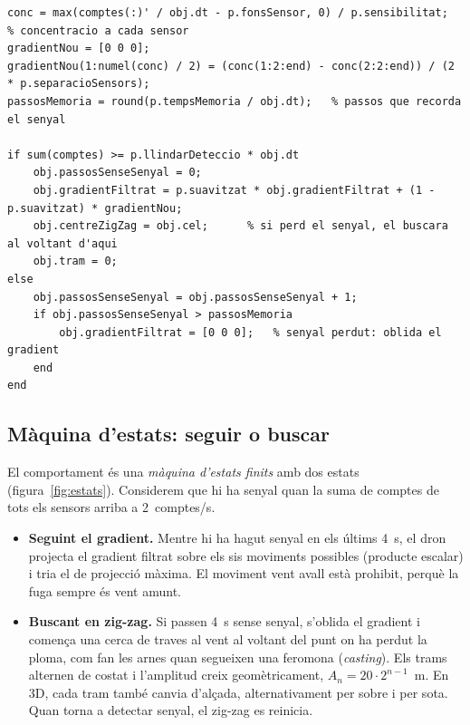 \documentclass[11pt,a4paper]{article}
\begin{document}
\begin{lstlisting}[caption={Estimació i filtratge del gradient, i detecció del senyal (part de \texttt{Dron.gradientDecidir}).}, label=lst:gradest]
conc = max(comptes(:)' / obj.dt - p.fonsSensor, 0) / p.sensibilitat;   % concentracio a cada sensor
gradientNou = [0 0 0];
gradientNou(1:numel(conc) / 2) = (conc(1:2:end) - conc(2:2:end)) / (2 * p.separacioSensors);
passosMemoria = round(p.tempsMemoria / obj.dt);   % passos que recorda el senyal

if sum(comptes) >= p.llindarDeteccio * obj.dt
    obj.passosSenseSenyal = 0;
    obj.gradientFiltrat = p.suavitzat * obj.gradientFiltrat + (1 - p.suavitzat) * gradientNou;
    obj.centreZigZag = obj.cel;      % si perd el senyal, el buscara al voltant d'aqui
    obj.tram = 0;
else
    obj.passosSenseSenyal = obj.passosSenseSenyal + 1;
    if obj.passosSenseSenyal > passosMemoria
        obj.gradientFiltrat = [0 0 0];   % senyal perdut: oblida el gradient
    end
end
\end{lstlisting}

\subsection{Màquina d'estats: seguir o buscar}

El comportament és una \emph{màquina d'estats finits} amb dos estats (figura~\ref{fig:estats}). Considerem que hi ha senyal quan la suma de comptes de tots els sensors arriba a 2~comptes/s.
\begin{itemize}
\item \textbf{Seguint el gradient.} Mentre hi ha hagut senyal en els últims 4~s, el dron projecta el gradient filtrat sobre els sis moviments possibles (producte escalar) i tria el de projecció màxima. El moviment vent avall està prohibit, perquè la fuga sempre és vent amunt.
\item \textbf{Buscant en zig-zag.} Si passen 4~s sense senyal, s'oblida el gradient i comença una cerca de traves al vent al voltant del punt on ha perdut la ploma, com fan les arnes quan segueixen una feromona (\emph{casting}). Els trams alternen de costat i l'amplitud creix geomètricament, $A_n = 20 \cdot 2^{n-1}$~m. En 3D, cada tram també canvia d'alçada, alternativament per sobre i per sota. Quan torna a detectar senyal, el zig-zag es reinicia.
\end{itemize}
\end{document}
